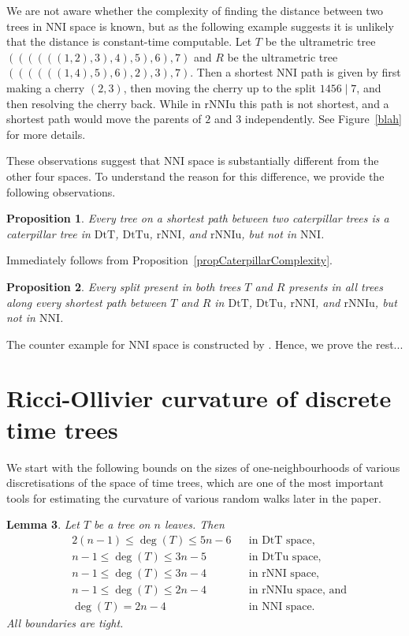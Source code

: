 \documentclass{amsart}
\newtheorem{lemma}{Lemma}
\newtheorem{proposition}[lemma]{Proposition}
\newcommand{\nni}{\mathrm{NNI}}
\newcommand{\rnni}{\mathrm{rNNI}}
\newcommand{\rnniu}{\mathrm{rNNIu}}
\newcommand{\mdts}{\mathrm{DtT}}
\newcommand{\mdtsu}{\mathrm{DtTu}}
\begin{document}
\proof

\endproof

We are not aware whether the complexity of finding the distance between two trees in $\nni$ space is known, but as the following example suggests it is unlikely that the distance is constant-time computable.
Let $T$ be the ultrametric tree $((((((1, 2), 3), 4), 5), 6), 7)$ and $R$ be the ultrametric tree $((((((1, 4), 5), 6), 2), 3), 7)$.
Then a shortest $\nni$ path is given by first making a cherry $(2,3)$, then moving the cherry up to the split $1456 \mid 7$, and then resolving the cherry back.
While in $\rnniu$ this path is not shortest, and a shortest path would move the parents of $2$ and $3$ independently.
See Figure~\ref{blah} for more details.

These observations suggest that $\nni$ space is substantially different from the other four spaces.
To understand the reason for this difference, we provide the following observations.

\begin{proposition}
Every tree on a shortest path between two caterpillar trees is a caterpillar tree in $\mdts$, $\mdtsu$, $\rnni$, and $\rnniu$, but not in $\nni$.
\end{proposition}

\proof
Immediately follows from Proposition~\ref{propCaterpillarComplexity}.
\endproof

\begin{proposition}
Every split present in both trees $T$ and $R$ presents in all trees along every shortest path between $T$ and $R$ in $\mdts$, $\mdtsu$, $\rnni$, and $\rnniu$, but not in $\nni$.
\end{proposition}

\proof
The counter example for $\nni$ space is constructed by \textcite{hardToFind}.
Hence, we prove the rest...
\endproof


\section{Ricci-Ollivier curvature of discrete time trees}

We start with the following bounds on the sizes of one-neighbourhoods of various discretisations of the space of time trees, which are one of the most important tools for estimating the curvature of various random walks later in the paper.

\begin{lemma}\label{neighBound}
Let $T$ be a tree on $n$ leaves.
Then
\begin{align*}
& 2(n-1) \leq \deg(T) \leq 5n-6 	&&	\mbox{in $\mdts$ space,}\\
& n-1 \leq \deg(T) \leq 3n-5	&&	\mbox{in $\mdtsu$ space,}\\
& n-1\leq \deg(T) \leq3n-4 		&&	\mbox{in $\rnni$ space,}\\
& n-1 \leq \deg(T) \leq 2n-4 	&&	\mbox{in $\rnniu$ space, and}\\
& \deg(T) = 2n-4 			&&	\mbox{in $\nni$ space.}
\end{align*}
All boundaries are tight.
\end{lemma}
\end{document}

